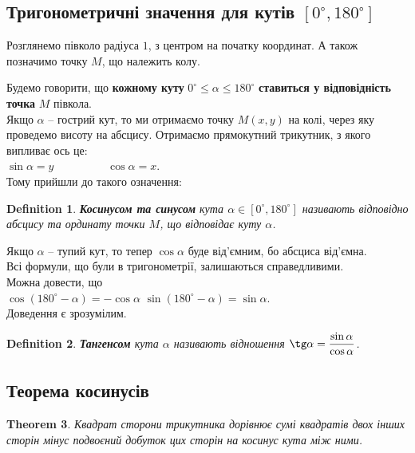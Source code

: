 \documentclass[a4paper, 10pt]{article}
\theoremstyle{theoremdd}
\newtheorem{theorem}{Theorem}[subsection]
\theoremstyle{theoremdd}
\theoremstyle{theoremdd}
\newtheorem{definition}[theorem]{Definition}
\theoremstyle{theoremdd}
\theoremstyle{theoremdd}
\theoremstyle{theoremdd}
\theoremstyle{theoremdd}
\theoremstyle{theoremdd}
\theoremstyle{theoremdd}
\begin{document}
\subsection{Тригонометричні значення для кутів $[0^\circ,180^\circ]$}
Розглянемо півколо радіуса $1$, з центром на початку координат. А також позначимо точку $M$, що належить колу.
\begin{figure}[H]
\centering
{}
\end{figure}
Будемо говорити, що \textbf{кожному куту} $0^{\circ} \leq \alpha \leq 180^\circ$ \textbf{ставиться у відповідність точка} $M$ півкола.\\
Якщо $\alpha$ -- гострий кут, то ми отримаємо точку $M(x,y)$ на колі, через яку проведемо висоту на абсцису. Отримаємо прямокутний трикутник, з якого випливає ось це:\\
$\sin \alpha = y \hspace{2cm} \cos \alpha = x$.\\
Тому прийшли до такого означення:
\begin{definition}
\textbf{Косинусом та синусом} кута $\alpha \in [0^\circ,180^\circ]$ називають відповідно абсцису та ординату точки $M$, що відповідає куту $\alpha$.
\end{definition}
Якщо $\alpha$ -- тупий кут, то тепер $\cos \alpha$ буде від'ємним, бо абсциса від'ємна.
\bigskip \\
Всі формули, що були в тригонометрії, залишаються справедливими.
\bigskip \\
Можна довести, що \\
$\cos (180^\circ-\alpha) = -\cos \alpha$ \hspace{1cm} $\sin (180^\circ - \alpha) = \sin \alpha$.\\
Доведення є зрозумілим.

\begin{definition}
\textbf{Тангенсом} кута $\alpha$ називають відношення $\tg \alpha = \dfrac{\sin \alpha}{\cos \alpha}$.
\end{definition}

\subsection{Теорема косинусів}
\begin{theorem}
Квадрат сторони трикутника дорівнює сумі квадратів двох інших сторін мінус подвоєний добуток цих сторін на косинус кута між ними.
\end{theorem}
\end{document}
